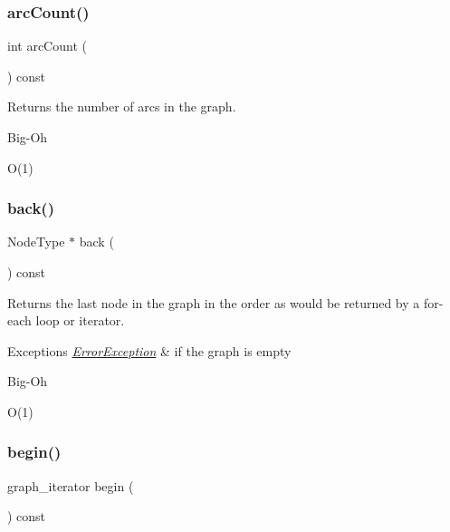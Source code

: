\subsubsection{\texorpdfstring{arc\+Count()}{arcCount()}}
{\footnotesize\ttfamily int arc\+Count (\begin{DoxyParamCaption}{ }\end{DoxyParamCaption}) const}



Returns the number of arcs in the graph. 

\begin{DoxyRefDesc}{Big-\/\+Oh}
\item[\mbox{\hyperlink{BigOh__BigOh000047}{Big-\/\+Oh}}]O(1) \end{DoxyRefDesc}
\mbox{\label{classGraph_a27d59ef129bb56cc144ecc81c0affd34}} 
\subsubsection{\texorpdfstring{back()}{back()}}
{\footnotesize\ttfamily Node\+Type $\ast$ back (\begin{DoxyParamCaption}{ }\end{DoxyParamCaption}) const}



Returns the last node in the graph in the order as would be returned by a for-\/each loop or iterator. 


\begin{DoxyExceptions}{Exceptions}
{\em \mbox{\hyperlink{classErrorException}{Error\+Exception}}} & if the graph is empty \\
\hline
\end{DoxyExceptions}
\begin{DoxyRefDesc}{Big-\/\+Oh}
\item[\mbox{\hyperlink{BigOh__BigOh000048}{Big-\/\+Oh}}]O(1) \end{DoxyRefDesc}
\mbox{\label{classGraph_aea3a8950c46f4ac913207201b685e715}} 
\subsubsection{\texorpdfstring{begin()}{begin()}}
{\footnotesize\ttfamily graph\+\_\+iterator begin (\begin{DoxyParamCaption}{ }\end{DoxyParamCaption}) const\hspace{0.3cm}{\ttfamily [inline]}}



